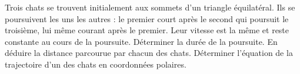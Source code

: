 \begin{Exercise}[title=trois chats et un triangle]
  Trois chats se trouvent initialement aux sommets d'un triangle équilatéral. Ils se poursuivent les uns les autres : le premier court après le second qui poursuit le troisième, lui même courant après le premier. Leur vitesse est la même et reste constante au cours de la poursuite.
\Question Déterminer la durée de la poursuite.
\Question En déduire la distance parcourue par chacun des chats.
\Question Déterminer l'équation de la trajectoire d'un des chats en coordonnées polaires.
\end{Exercise}
\begin{Answer}
\end{Answer}

